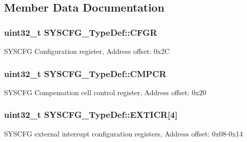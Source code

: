 \subsection{Member Data Documentation}
\subsubsection[{\texorpdfstring{C\+F\+GR}{CFGR}}]{ uint32\+\_\+t S\+Y\+S\+C\+F\+G\+\_\+\+Type\+Def\+::\+C\+F\+GR}\hypertarget{struct_s_y_s_c_f_g___type_def_af9e58364169ac3d84d12f9e4aabf1f62}{}\label{struct_s_y_s_c_f_g___type_def_af9e58364169ac3d84d12f9e4aabf1f62}
S\+Y\+S\+C\+FG Configuration register, Address offset\+: 0x2C 
\subsubsection[{\texorpdfstring{C\+M\+P\+CR}{CMPCR}}]{ uint32\+\_\+t S\+Y\+S\+C\+F\+G\+\_\+\+Type\+Def\+::\+C\+M\+P\+CR}\hypertarget{struct_s_y_s_c_f_g___type_def_ada13497abc6402300570ff5f430a612e}{}\label{struct_s_y_s_c_f_g___type_def_ada13497abc6402300570ff5f430a612e}
S\+Y\+S\+C\+FG Compensation cell control register, Address offset\+: 0x20 
\subsubsection[{\texorpdfstring{E\+X\+T\+I\+CR}{EXTICR}}]{ uint32\+\_\+t S\+Y\+S\+C\+F\+G\+\_\+\+Type\+Def\+::\+E\+X\+T\+I\+CR\mbox{[}4\mbox{]}}\hypertarget{struct_s_y_s_c_f_g___type_def_a66a06b3aab7ff5c8fa342f7c1994bf7d}{}\label{struct_s_y_s_c_f_g___type_def_a66a06b3aab7ff5c8fa342f7c1994bf7d}
S\+Y\+S\+C\+FG external interrupt configuration registers, Address offset\+: 0x08-\/0x14 

